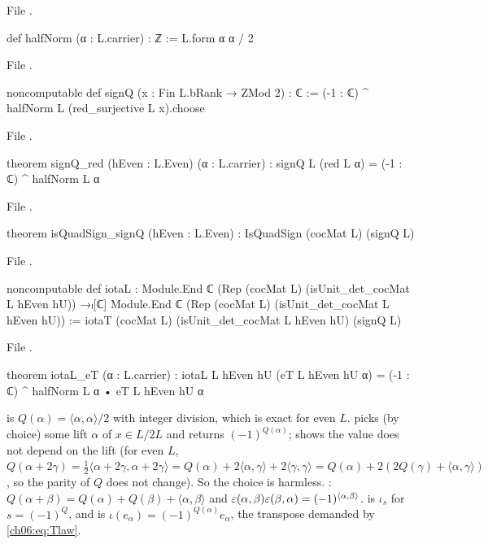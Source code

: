 \noindent File .
\begin{leancode}
def halfNorm (α : L.carrier) : ℤ := L.form α α / 2
\end{leancode}
\noindent File .
\begin{leancode}
noncomputable def signQ (x : Fin L.bRank → ZMod 2) : ℂ :=
  (-1 : ℂ) ^ halfNorm L (red_surjective L x).choose
\end{leancode}
\noindent File .
\begin{leancode}
theorem signQ_red (hEven : L.Even) (α : L.carrier) :
    signQ L (red L α) = (-1 : ℂ) ^ halfNorm L α
\end{leancode}
\noindent File .
\begin{leancode}
theorem isQuadSign_signQ (hEven : L.Even) : IsQuadSign (cocMat L) (signQ L)
\end{leancode}
\noindent File .
\begin{leancode}
noncomputable def iotaL :
    Module.End ℂ (Rep (cocMat L) (isUnit_det_cocMat L hEven hU)) →ₗ[ℂ]
      Module.End ℂ (Rep (cocMat L) (isUnit_det_cocMat L hEven hU)) :=
  iotaT (cocMat L) (isUnit_det_cocMat L hEven hU) (signQ L)
\end{leancode}
\noindent File .
\begin{leancode}
theorem iotaL_eT (α : L.carrier) :
    iotaL L hEven hU (eT L hEven hU α) = (-1 : ℂ) ^ halfNorm L α • eT L hEven hU α
\end{leancode}
\begin{dictionary}
 is $Q(\alpha)=\langle\alpha,\alpha\rangle/2$ with integer division, which is
exact for even $L$.   picks (by choice) some lift $\alpha$ of $x\in L/2L$ and
returns $(-1)^{Q(\alpha)}$;  shows the value does not depend on the lift (for even
$L$, $Q(\alpha+2\gamma)=\frac12\langle\alpha+2\gamma,\alpha+2\gamma\rangle=Q(\alpha)
+2\langle\alpha,\gamma\rangle+2\langle\gamma,\gamma\rangle=Q(\alpha)+2(2Q(\gamma)+
\langle\alpha,\gamma\rangle)$, so the parity of $Q$ does not change).  So the choice is
harmless.  : $Q(\alpha+\beta)=Q(\alpha)+Q(\beta)+\langle\alpha,\beta\rangle$
and $\varepsilon(\alpha,\beta)\varepsilon(\beta,\alpha)=(-1)^{\langle\alpha,\beta\rangle}$.
 is $\iota_s$ for $s=(-1)^Q$, and  is $\iota(e_\alpha)=
(-1)^{Q(\alpha)}e_\alpha$, the transpose demanded by \eqref{ch06:eq:Tlaw}.
\end{dictionary}

